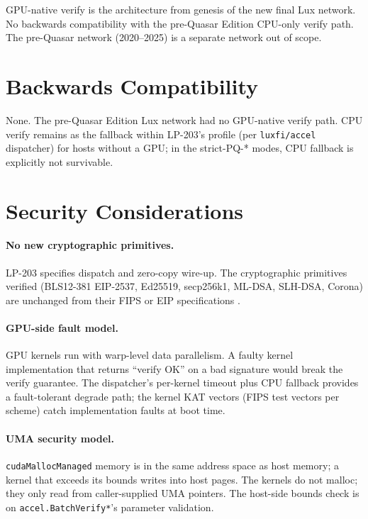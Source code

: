 GPU-native verify is the architecture from genesis of the new
final Lux network. No backwards compatibility with the pre-Quasar
Edition CPU-only verify path. The pre-Quasar network
(\num{2020}--\num{2025}) is a separate network out of scope.

\section{Backwards Compatibility}

None. The pre-Quasar Edition Lux network had no GPU-native
verify path. CPU verify remains as the fallback within
LP-203's profile (per \texttt{luxfi/accel} dispatcher) for
hosts without a GPU; in the strict-PQ-* modes, CPU fallback
is explicitly not survivable.

\section{Security Considerations}

\paragraph{No new cryptographic primitives.} LP-203 specifies
dispatch and zero-copy wire-up. The cryptographic primitives
verified (BLS12-381 EIP-2537, Ed25519, secp256k1, ML-DSA,
SLH-DSA, Corona) are unchanged from their FIPS or
EIP specifications \cite{fips203,fips204,fips205,eip2537}.

\paragraph{GPU-side fault model.} GPU kernels run with
warp-level data parallelism. A faulty kernel implementation
that returns ``verify OK'' on a bad signature would break the
verify guarantee. The dispatcher's per-kernel timeout plus
CPU fallback provides a fault-tolerant degrade path; the
kernel KAT vectors (FIPS test vectors per scheme) catch
implementation faults at boot time.

\paragraph{UMA security model.} \texttt{cudaMallocManaged}
memory is in the same address space as host memory; a kernel
that exceeds its bounds writes into host pages. The kernels
do not malloc; they only read from caller-supplied UMA
pointers. The host-side bounds check is on
\texttt{accel.BatchVerify*}'s parameter validation.

